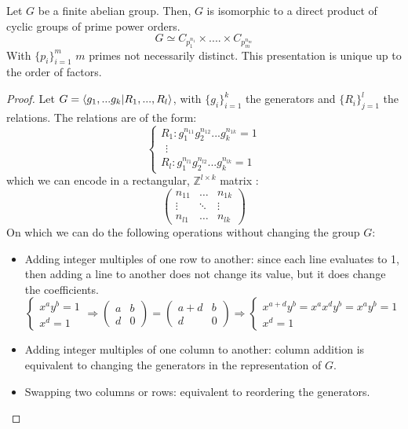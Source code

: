 \begin{theorem}
  Let $G$ be a finite abelian group. Then, $G$ is isomorphic to a direct product of cyclic groups of prime power orders.
  \[
    G \simeq C_{p_1^{n_1}} \times .... \times C_{p_m^{n_m}}
  \]
  With $\{p_i\}_{i = 1}^{m}$ $m$ primes not necessarily distinct. This presentation is unique up to the order of factors. 
\end{theorem}
\begin{proof}
  Let $G = \langle g_1,...g_k | R_1, ..., R_l \rangle$, with $\{g_i\}_{i = 1}^k$ the generators and $\{R_i\}_{j = 1}^l$ the relations. The relations are of the form: 
  \[
    \begin{cases}
      R_1: g_1^{n_{11}}g_2^{n_{12}}...g_k^{n_{1k}} = 1 \\
      \ \ \vdots \\
      R_l: g_1^{n_{l1}}g_2^{n_{l2}}...g_k^{n_{lk}} = 1
    \end{cases}
  \]
  which we can encode in a rectangular, $\mathbb{Z}^{l \times k}$ matrix : 
  \[
    \begin{pmatrix}
      n_{11} &  \dots & n_{1k} \\
      \vdots & \ddots & \vdots \\
      n_{l1} &  \dots & n_{lk}
    \end{pmatrix}
  \]
  On which we can do the following operations without changing the group $G$:
  \begin{itemize}
    \item Adding integer multiples of one row to another: since each line evaluates to 1, then adding a line to another does not change its value, but it does change the coefficients. 
    \[
      \begin{cases}
        x^ay^b = 1 \\
        x^d = 1
      \end{cases} \Rightarrow
      \begin{pmatrix}
        a & b \\
        d & 0 
      \end{pmatrix} =
      \begin{pmatrix}
        a + d & b \\
        d & 0 
      \end{pmatrix} \Rightarrow
      \begin{cases}
          x^{a+d} y^b = x^ax^dy^b = x^ay^b = 1 \\
          x^d = 1
      \end{cases}
    \]
    \item Adding integer multiples of one column to another: column addition is equivalent to changing the generators in the representation of $G$. 
    \item Swapping two columns or rows: equivalent to reordering the generators. 
  \end{itemize}


\end{proof}
